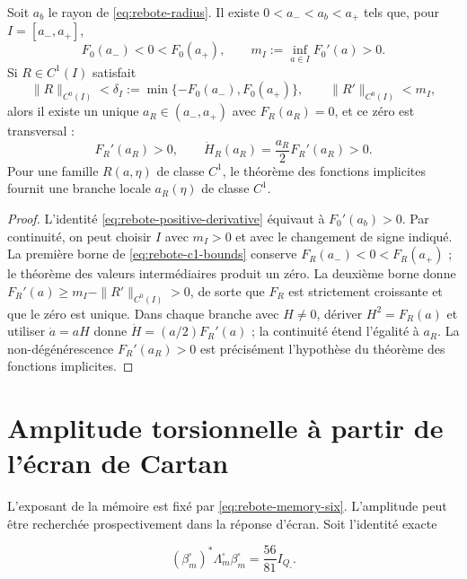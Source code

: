\begin{theorem}
\label{thm:rebote-c1-persistence}
Soit \(a_b\) le rayon de \cref{eq:rebote-radius}. Il existe
\(0<a_-<a_b<a_+\) tels que, pour
\(I=[a_-,a_+]\),
\[
 F_0(a_-)<0<F_0(a_+),
 \qquad
 m_I:=\inf_{a\in I}F_0'(a)>0.
\]
Si \(R\in C^1(I)\) satisfait
\begin{equation}
 \|R\|_{C^0(I)}
 <\delta_I
 :=\min\{-F_0(a_-),F_0(a_+)\},
 \qquad
 \|R'\|_{C^0(I)}<m_I,
 \label{eq:rebote-c1-bounds}
\end{equation}
alors il existe un unique \(a_R\in(a_-,a_+)\) avec \(F_R(a_R)=0\), et
ce zéro est transversal :
\begin{equation}
 F_R'(a_R)>0,
 \qquad
 \dot H_R(a_R)=\frac{a_R}{2}F_R'(a_R)>0.
 \label{eq:rebote-perturbed-transversality}
\end{equation}
Pour une famille \(R(a,\eta)\) de classe \(C^1\), le théorème des fonctions
implicites fournit une branche locale \(a_R(\eta)\) de classe \(C^1\).
\end{theorem}

\begin{proof}
L'identité \cref{eq:rebote-positive-derivative} équivaut à
\(F_0'(a_b)>0\). Par continuité, on peut choisir \(I\) avec
\(m_I>0\) et avec le changement de signe indiqué. La première borne de
\cref{eq:rebote-c1-bounds} conserve
\(F_R(a_-)<0<F_R(a_+)\) ; le théorème des valeurs intermédiaires produit un zéro.
La deuxième borne donne
\(F_R'(a)\geq m_I-\|R'\|_{C^0(I)}>0\), de sorte que \(F_R\) est strictement
croissante et que le zéro est unique. Dans chaque branche avec \(H\neq0\), dériver
\(H^2=F_R(a)\) et utiliser \(\dot a=aH\) donne
\(\dot H=(a/2)F_R'(a)\) ; la continuité étend l'égalité à \(a_R\).
La non-dégénérescence \(F_R'(a_R)>0\) est précisément l'hypothèse du
théorème des fonctions implicites.
\end{proof}

\section{Amplitude torsionnelle à partir de l'écran de Cartan}

L'exposant de la mémoire est fixé par
\cref{eq:rebote-memory-six}. L'amplitude peut être recherchée prospectivement dans
la réponse d'écran. Soit l'identité exacte

\begin{equation}
 (\beta_m^{\square})^*\Lambda_m^{\square}\beta_m^{\square}
 =\frac{56}{81}I_{Q_{\square}}.
 \label{eq:rebote-screen-energy}
\end{equation}

